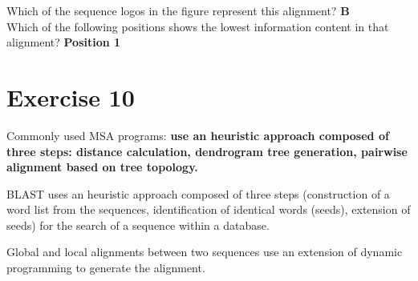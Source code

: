 Which of the sequence logos in the figure represent this alignment? \textbf{B} \\
Which of the following positions shows the lowest information content in that alignment? \textbf{Position 1}

\section{Exercise 10}
Commonly used MSA programs: \textbf{use an heuristic approach composed of three steps: distance calculation, dendrogram tree generation, pairwise alignment based on tree topology.}

BLAST uses  an heuristic approach composed of three steps (construction of a word list from the sequences, identification of identical words (seeds), extension of seeds) for the search of a sequence within a database. 

Global and local alignments between two sequences  use an extension of dynamic programming to generate the alignment.